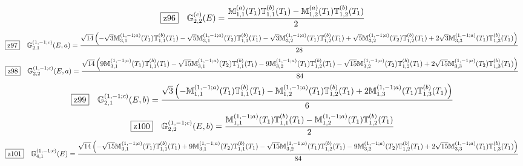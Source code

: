 \documentclass[fleqn,10pt,landscape]{jsarticle}
\begin{document}
\begin{dmath*}
\hspace*{3mm}\fbox{z96}\quad \mathbb{G}_{2,2}^{(c)}(E)=\frac{\mathbb{M}_{1,1}^{(a)}(T_{1}) \mathbb{T}_{1,1}^{(b)}(T_{1}) - \mathbb{M}_{1,2}^{(a)}(T_{1}) \mathbb{T}_{1,2}^{(b)}(T_{1})}{2}
\end{dmath*}
\begin{dmath*}
\hspace*{3mm}\fbox{z97}\quad \mathbb{G}_{2,1}^{(1,-1;c)}(E,a)=\frac{\sqrt{14} \left(- \sqrt{3} \mathbb{M}_{3,1}^{(1,-1;a)}(T_{1}) \mathbb{T}_{1,1}^{(b)}(T_{1}) - \sqrt{5} \mathbb{M}_{3,1}^{(1,-1;a)}(T_{2}) \mathbb{T}_{1,1}^{(b)}(T_{1}) - \sqrt{3} \mathbb{M}_{3,2}^{(1,-1;a)}(T_{1}) \mathbb{T}_{1,2}^{(b)}(T_{1}) + \sqrt{5} \mathbb{M}_{3,2}^{(1,-1;a)}(T_{2}) \mathbb{T}_{1,2}^{(b)}(T_{1}) + 2 \sqrt{3} \mathbb{M}_{3,3}^{(1,-1;a)}(T_{1}) \mathbb{T}_{1,3}^{(b)}(T_{1})\right)}{28}
\end{dmath*}
\begin{dmath*}
\hspace*{3mm}\fbox{z98}\quad \mathbb{G}_{2,2}^{(1,-1;c)}(E,a)=\frac{\sqrt{14} \left(9 \mathbb{M}_{3,1}^{(1,-1;a)}(T_{1}) \mathbb{T}_{1,1}^{(b)}(T_{1}) - \sqrt{15} \mathbb{M}_{3,1}^{(1,-1;a)}(T_{2}) \mathbb{T}_{1,1}^{(b)}(T_{1}) - 9 \mathbb{M}_{3,2}^{(1,-1;a)}(T_{1}) \mathbb{T}_{1,2}^{(b)}(T_{1}) - \sqrt{15} \mathbb{M}_{3,2}^{(1,-1;a)}(T_{2}) \mathbb{T}_{1,2}^{(b)}(T_{1}) + 2 \sqrt{15} \mathbb{M}_{3,3}^{(1,-1;a)}(T_{2}) \mathbb{T}_{1,3}^{(b)}(T_{1})\right)}{84}
\end{dmath*}
\begin{dmath*}
\hspace*{3mm}\fbox{z99}\quad \mathbb{G}_{2,1}^{(1,-1;c)}(E,b)=\frac{\sqrt{3} \left(- \mathbb{M}_{1,1}^{(1,-1;a)}(T_{1}) \mathbb{T}_{1,1}^{(b)}(T_{1}) - \mathbb{M}_{1,2}^{(1,-1;a)}(T_{1}) \mathbb{T}_{1,2}^{(b)}(T_{1}) + 2 \mathbb{M}_{1,3}^{(1,-1;a)}(T_{1}) \mathbb{T}_{1,3}^{(b)}(T_{1})\right)}{6}
\end{dmath*}
\begin{dmath*}
\hspace*{3mm}\fbox{z100}\quad \mathbb{G}_{2,2}^{(1,-1;c)}(E,b)=\frac{\mathbb{M}_{1,1}^{(1,-1;a)}(T_{1}) \mathbb{T}_{1,1}^{(b)}(T_{1}) - \mathbb{M}_{1,2}^{(1,-1;a)}(T_{1}) \mathbb{T}_{1,2}^{(b)}(T_{1})}{2}
\end{dmath*}
\begin{dmath*}
\hspace*{3mm}\fbox{z101}\quad \mathbb{G}_{4,1}^{(1,-1;c)}(E)=\frac{\sqrt{14} \left(- \sqrt{15} \mathbb{M}_{3,1}^{(1,-1;a)}(T_{1}) \mathbb{T}_{1,1}^{(b)}(T_{1}) + 9 \mathbb{M}_{3,1}^{(1,-1;a)}(T_{2}) \mathbb{T}_{1,1}^{(b)}(T_{1}) - \sqrt{15} \mathbb{M}_{3,2}^{(1,-1;a)}(T_{1}) \mathbb{T}_{1,2}^{(b)}(T_{1}) - 9 \mathbb{M}_{3,2}^{(1,-1;a)}(T_{2}) \mathbb{T}_{1,2}^{(b)}(T_{1}) + 2 \sqrt{15} \mathbb{M}_{3,3}^{(1,-1;a)}(T_{1}) \mathbb{T}_{1,3}^{(b)}(T_{1})\right)}{84}
\end{dmath*}
\end{document}
